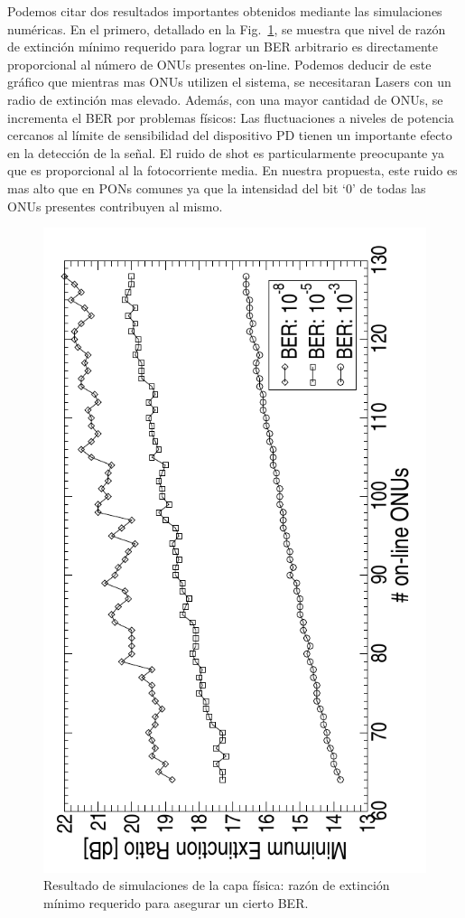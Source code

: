 Podemos citar dos resultados importantes obtenidos mediante las simulaciones numéricas. 
En el primero, detallado en la Fig.~\ref{sim:optical}, se muestra que nivel de razón de extinción mínimo requerido para lograr un BER arbitrario es directamente proporcional al número de ONUs presentes on-line.
Podemos deducir de este gráfico que mientras mas ONUs utilizen el sistema, se necesitaran Lasers con un radio de extinción mas elevado. Además, con una mayor cantidad de ONUs, se incrementa el BER por problemas físicos: Las fluctuaciones a niveles de potencia cercanos al límite de sensibilidad del dispositivo PD tienen un importante efecto en la detección de la señal.
El ruido de shot es particularmente preocupante ya que es proporcional al la fotocorriente media. En nuestra propuesta, este ruido es mas alto que en PONs comunes ya que la intensidad del bit `0' de todas las ONUs presentes contribuyen al mismo.
\begin{figure}[!t]
    \centering
      \includegraphics[angle= 270, width=3.5 in]{graphs/orte03.pdf}
      \caption{Resultado de simulaciones de la capa física: razón de extinción mínimo requerido para asegurar un cierto BER.}
      \label{sim:optical}
\end{figure}
